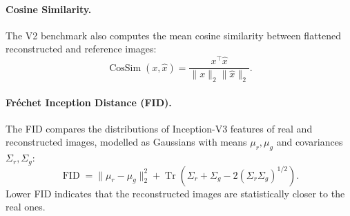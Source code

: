 \paragraph{Cosine Similarity.}
The V2 benchmark also computes the mean cosine similarity between flattened reconstructed and reference images:
\begin{equation}
    \operatorname{CosSim}(x,\hat x)=
    \frac{x^\top\hat x}{\|x\|_2\|\hat x\|_2}.
\end{equation}

\paragraph{Fr\'echet Inception Distance (FID).}
The FID compares the distributions of Inception-V3 features of real and reconstructed images, modelled as Gaussians with means $\mu_r,\mu_g$ and covariances $\Sigma_r,\Sigma_g$:
\begin{equation}
    \operatorname{FID}=\|\mu_r-\mu_g\|_2^2+
    \operatorname{Tr}\!\left(\Sigma_r+\Sigma_g-2(\Sigma_r\Sigma_g)^{1/2}\right).
\end{equation}
Lower FID indicates that the reconstructed images are statistically closer to the real ones.
